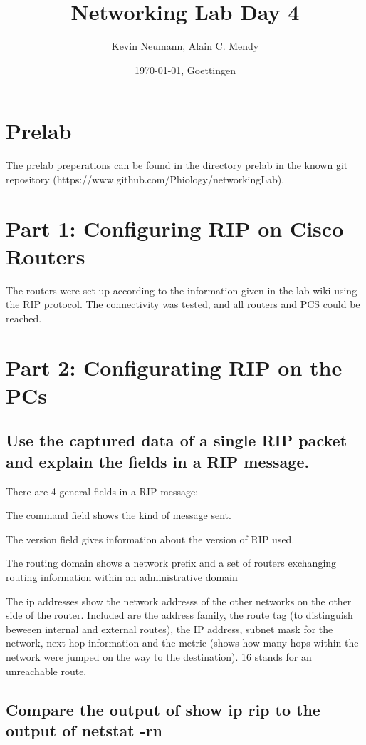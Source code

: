 \documentclass[a4paper, 11pt]{article}
\title{Networking Lab Day 4}
\author{Kevin Neumann, Alain C. Mendy}
\date{\today{}, Goettingen}
\begin{document}
\maketitle
\newpage
\tableofcontents
\newpage
\section{Prelab}

The prelab preperations can be found in the directory prelab in the known git repository (https://www.github.com/Phiology/networkingLab).

\section{Part 1: Configuring RIP on Cisco Routers}

The routers were set up according to the information given in the lab wiki using the RIP protocol. The connectivity was tested, and all routers and PCS could be reached.

\section{Part 2: Configurating RIP on the PCs}

\subsection{Use the captured data of a single RIP packet and explain the fields in a RIP message.}

There are 4 general fields in a RIP message:

The command field shows the kind of message sent.

The version field gives information about the version of RIP used.

The routing domain shows a network prefix and a set of routers exchanging routing information within an administrative domain

The ip addresses show the network addresss of the other networks on the other side of the router. Included are the address family, the route tag (to distinguish beweeen internal and external routes), the IP address, subnet mask for the network, next hop information and the metric (shows how many hops within the network were jumped on the way to the destination). 16 stands for an unreachable route.

\subsection{Compare the output of show ip rip to the output of netstat -rn}
\end{document}
